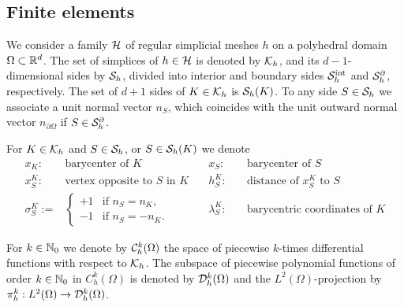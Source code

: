 \subsection{Finite elements}\label{subsec:}
%
%
We consider a family $\mathcal H$ of regular simplicial meshes $h$ on a polyhedral domain $\Omega\subset \mathbb R^d$. 
The set of simplices of $h\in\mathcal H$ is denoted by $\mathcal K_h$, and its $d-1$-dimensional sides by $\mathcal S_h$, divided into interior and boundary sides $\mathcal S^{\rm int}_h$ and $\mathcal S^{\partial}_h$, respectively. 
The set of $d+1$ sides of $K\in\mathcal K_h$ is $\mathcal S_h(K)$. To any side $S\in\mathcal S_h$ we associate a unit normal vector $n_S$, which coincides with the unit outward normal vector $n_{\partial\Omega}$ if $S\in\mathcal S^{\partial}_h$.

For $K\in\mathcal K_h$ and $S\in\mathcal S_h$, or $S\in\mathcal S_h(K)$ we denote
%
\begin{align*}
x_K:\quad& \mbox{barycenter of $K$} \quad& x_S:\quad & \mbox{barycenter of $S$}\\
x_S^K:\quad & \mbox{vertex opposite to $S$ in $K$} \quad& h_S^K:\quad & \mbox{distance of $x_S^K$ to $S$}\\
\sigma_{S}^K :=&\begin{cases}
+1 & \mbox{if $n_S=n_K$},\\
-1 & \mbox{if $n_S=-n_K$}.
\end{cases}\quad&
\lambda_S^K:\quad& \mbox{barycentric coordinates of $K$} 
\end{align*}


For $k\in\mathbb N_0$ we denote by $\mathcal{C}_h^k(\Omega)$ the space of piecewise $k$-times differential functions with respect to $\mathcal K_h$. The subspace of piecewise polynomial functions of order $k\in\mathbb N_0$ in $C^k_h(\Omega)$ is denoted by $\mathcal{D}_h^k(\Omega)$ and the $L^2(\Omega)$-projection by $\pi_h^k:L^2(\Omega)\to\mathcal{D}_h^k(\Omega)$.

%
